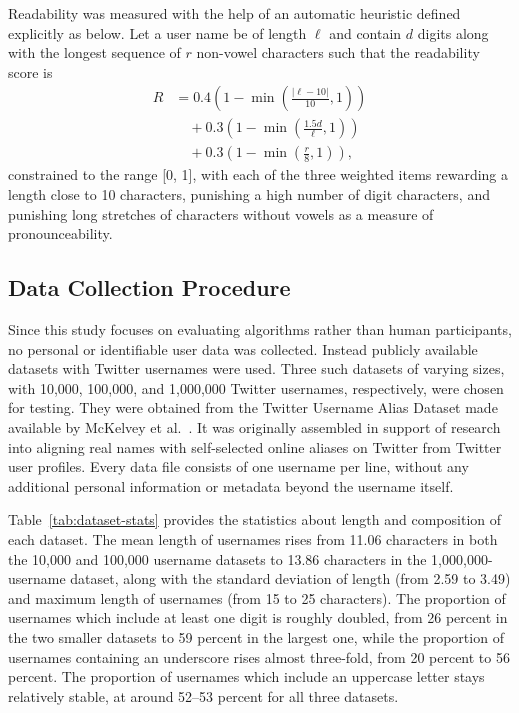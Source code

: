 \documentclass[conference]{IEEEtran}
\begin{document}
Readability was measured with the help of an automatic heuristic
defined explicitly as below. Let a user name be of length $\ell$
and contain $d$ digits along with the longest sequence of
$r$ non-vowel characters such that the readability score is
\begin{equation}
\begin{split}
R &= 0.4\left(1-\min\left(\frac{|\ell-10|}{10},1\right)\right) \\
&\quad + 0.3\left(1-\min\left(\frac{1.5d}{\ell},1\right)\right) \\
&\quad + 0.3\left(1-\min\left(\frac{r}{8},1\right)\right),
\end{split}
\end{equation}
constrained to the range [0, 1], with each of the three
weighted items rewarding a length close to 10 characters,
punishing a high number of digit characters, and punishing long
stretches of characters without vowels as a measure of
pronounceability.

\subsection{Data Collection Procedure}
Since this study focuses on evaluating algorithms rather than human participants, no personal or identifiable user data was collected. Instead publicly available datasets with Twitter usernames were used. Three such datasets of varying sizes, with 10,000, 100,000, and 1,000,000 Twitter usernames, respectively, were chosen for testing. They were obtained from the Twitter Username Alias Dataset made available by McKelvey et al.\ \cite{b7}. It was originally assembled in support of research into aligning real names with self-selected online aliases on Twitter from Twitter user profiles. Every data file consists of one username per line, without any additional personal information or metadata beyond the username itself.

Table~\ref{tab:dataset-stats} provides the statistics about length and composition of each dataset. The mean length of usernames rises from 11.06 characters in both the 10,000 and 100,000 username datasets to 13.86 characters in the 1,000,000-username dataset, along with the standard
deviation of length (from 2.59 to 3.49) and maximum length of usernames
(from 15 to 25 characters). The proportion of usernames which include
at least one digit is roughly doubled, from 26 percent in the two smaller
datasets to 59 percent in the largest one, while the proportion of usernames containing an underscore rises almost three-fold, from 20 percent to 56 percent. The proportion of usernames which include an uppercase letter stays relatively stable, at around 52--53 percent for all three datasets.
\end{document}

